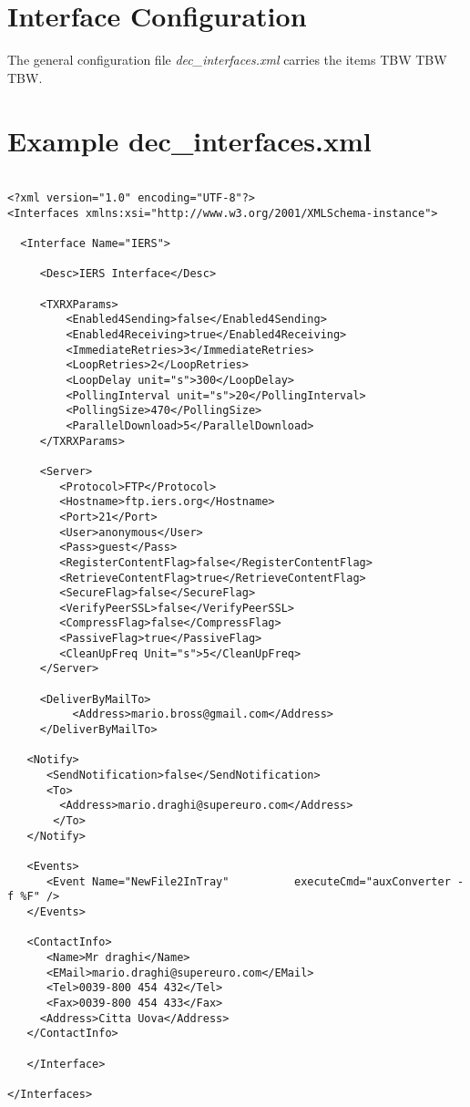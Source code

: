\documentclass[dec_sum_main.tex]{subfiles}
\begin{document}
\section{Interface Configuration}
 
\par
\noindent
The general configuration file \textit{dec\_interfaces.xml} carries the items TBW TBW TBW.


\label{decinterfacesxml}
\section{Example dec\_interfaces.xml}
\begin{verbatim}

<?xml version="1.0" encoding="UTF-8"?>
<Interfaces xmlns:xsi="http://www.w3.org/2001/XMLSchema-instance">

  <Interface Name="IERS">
     
     <Desc>IERS Interface</Desc>
     
     <TXRXParams>
         <Enabled4Sending>false</Enabled4Sending>
         <Enabled4Receiving>true</Enabled4Receiving>
         <ImmediateRetries>3</ImmediateRetries>
         <LoopRetries>2</LoopRetries>
         <LoopDelay unit="s">300</LoopDelay>
         <PollingInterval unit="s">20</PollingInterval>
         <PollingSize>470</PollingSize>
         <ParallelDownload>5</ParallelDownload>
     </TXRXParams>    

     <Server>
        <Protocol>FTP</Protocol>
        <Hostname>ftp.iers.org</Hostname>
        <Port>21</Port>
        <User>anonymous</User>
        <Pass>guest</Pass>
        <RegisterContentFlag>false</RegisterContentFlag>
        <RetrieveContentFlag>true</RetrieveContentFlag>
        <SecureFlag>false</SecureFlag>
        <VerifyPeerSSL>false</VerifyPeerSSL>
        <CompressFlag>false</CompressFlag>
        <PassiveFlag>true</PassiveFlag>
        <CleanUpFreq Unit="s">5</CleanUpFreq>
     </Server>
     
     <DeliverByMailTo>
	      <Address>mario.bross@gmail.com</Address>
     </DeliverByMailTo>

   <Notify>
	  <SendNotification>false</SendNotification>
	  <To>
		<Address>mario.draghi@supereuro.com</Address>
	   </To>
   </Notify>

   <Events>
      <Event Name="NewFile2InTray"          executeCmd="auxConverter -f %F" />
   </Events>

   <ContactInfo>
      <Name>Mr draghi</Name>
      <EMail>mario.draghi@supereuro.com</EMail>
      <Tel>0039-800 454 432</Tel>
      <Fax>0039-800 454 433</Fax>
     <Address>Citta Uova</Address>
   </ContactInfo>

   </Interface>

</Interfaces>

\end{verbatim}
\end{document}
